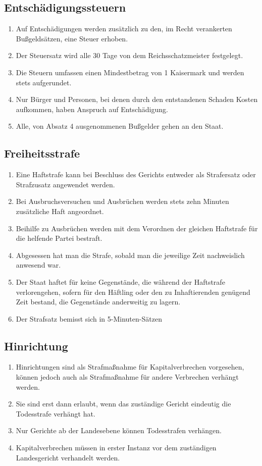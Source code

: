 \documentclass{article}
\begin{document}
\subsection{Entschädigungssteuern}
\begin{enumerate}[(1)]
    \item Auf Entschädigungen werden zusätzlich zu den, im Recht verankerten Bußgeldsätzen, eine Steuer erhoben.
    \item Der Steuersatz wird alle 30 Tage von dem Reichsschatzmeister festgelegt.
    \item Die Steuern umfassen einen Mindestbetrag von 1 Kaisermark und werden stets aufgerundet.
    \item Nur Bürger und Personen, bei denen durch den entstandenen Schaden Kosten aufkommen, haben Anspruch auf Entschädigung.
    \item Alle, von Absatz 4 ausgenommenen Bußgelder gehen an den Staat.
\end{enumerate}

\subsection{Freiheitsstrafe}
\begin{enumerate}[(1)]
    \item Eine Haftstrafe kann bei Beschluss des Gerichts entweder als Strafersatz oder Strafzusatz angewendet werden.
    \item Bei Ausbruchsversuchen und Ausbrüchen werden stets zehn Minuten zusätzliche Haft angeordnet.
    \item Beihilfe zu Ausbrüchen werden mit dem Verordnen der gleichen Haftstrafe für die helfende Partei bestraft.
    \item Abgesessen hat man die Strafe, sobald man die jeweilige Zeit nachweislich anwesend war.
    \item Der Staat haftet für keine Gegenstände, die während der Haftstrafe verlorengehen, sofern für den Häftling oder den zu Inhaftierenden genügend Zeit bestand, die Gegenstände anderweitig zu lagern.
    \item Der Strafsatz bemisst sich in 5-Minuten-Sätzen
\end{enumerate}

\subsection{Hinrichtung}
\begin{enumerate}[(1)]
    \item Hinrichtungen sind als Strafmaßnahme für Kapitalverbrechen vorgesehen, können jedoch auch als Strafmaßnahme für andere Verbrechen verhängt werden.
    \item Sie sind erst dann erlaubt, wenn das zuständige Gericht eindeutig die Todesstrafe verhängt hat.
    \item Nur Gerichte ab der Landesebene können Todesstrafen verhängen.
    \item Kapitalverbrechen müssen in erster Instanz vor dem zuständigen Landesgericht verhandelt werden.
\end{enumerate}
\end{document}
